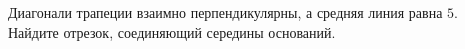 \begin{ex}
	\begin{condition}
		Диагонали трапеции взаимно перпендикулярны, а средняя линия равна \( 5 \). Найдите отрезок, соединяющий середины оснований.
	\end{condition}
\end{ex}